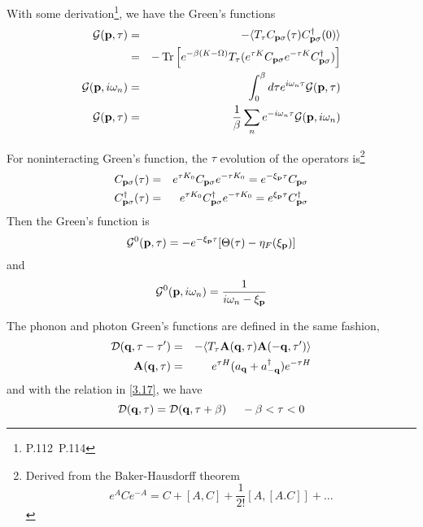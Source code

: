 With some derivation\footnote{P.112~P.114}, we have the Green's functions
\begin{eqnarray}
  \mathcal{G}(\mathbf{p},\tau)&=&-\langle T_\tau C_{\mathbf{p}\sigma}(\tau) C^\dagger_{\mathbf{p}\sigma}(0) \rangle \label{3.33}\\
    &=& -\Tr \left[ e^{-\beta (K-\Omega)} T_\tau (e^{\tau K} C_{\mathbf{p}\sigma} e^{-\tau K} C^\dagger_{\mathbf{p}\sigma})\right] \label{3.34} \\
  \mathcal{G}(\mathbf{p},i\omega_n) &=& \int_0^\beta d\tau e^{i\omega_n \tau} \mathcal{G}(\mathbf{p},\tau)  \label{3.39} \\
  \mathcal{G}(\mathbf{p},\tau) &=& \frac{1}{\beta} \sum_n e^{-i\omega_n \tau} \mathcal{G}(\mathbf{p},i\omega_n) \label{3.40}
\end{eqnarray}

For noninteracting Green's function, the $\tau$ evolution of the operators is\footnote{Derived from the Baker-Hausdorff theorem
\begin{equation*}
  e^ACe^{-A} = C+ [A,C] + \frac{1}{2!}[A,[A.C]]+\dots
\end{equation*}}
\begin{eqnarray}
  C_{\mathbf{p}\sigma}(\tau) &=& e^{\tau K_0} C_{\mathbf{p}\sigma} e^{-\tau K_0} = e^{-\xi_{\mathbf{p}} \tau} C_{\mathbf{p} \sigma } \label{3.44} \\
  C^\dagger_{\mathbf{p}\sigma}(\tau) &=& e^{\tau K_0} C^\dagger_{\mathbf{p}\sigma} e^{-\tau K_0} = e^{\xi_{\mathbf{p}} \tau} C_{\mathbf{p} \sigma }^\dagger \label{3.45}
\end{eqnarray}
Then the Green's function is
\begin{equation}
  \mathcal{G}^0(\mathbf{p},\tau)= -e^{-\xi_{\mathbf{p}} \tau}[\Theta(\tau)-\eta_F(\xi_{\mathbf{p}})] \label{3.49}
\end{equation}
and
\begin{equation}
  \mathcal{G}^0(\mathbf{p},i\omega_n) = \frac{1}{i\omega_n -\xi_{\mathbf{p}}}   \label{3.55}
\end{equation}

The phonon and photon Green's functions are defined in the same fashion,
\begin{eqnarray}
    \mathcal{D} (\mathbf{q},\tau-\tau') &=& - \langle T_\tau \mathbf{A}(\mathbf{q},\tau) \mathbf{A}(-\mathbf{q},\tau') \rangle \label{3.56} \\
    \mathbf{A}(\mathbf{q},\tau) &=& e^{\tau H}(a_{\mathbf{q}}+ a^\dagger_{-\mathbf{q}})e^{-\tau H} \label{3.57}
\end{eqnarray}
and with the relation in \eqref{3.17}, we have
\begin{equation}
  \mathcal{D} (\mathbf{q},\tau) = \mathcal{D} (\mathbf{q}, \tau+\beta)~ ~ ~ ~ -\beta<\tau<0 \label{3.63}
\end{equation}


